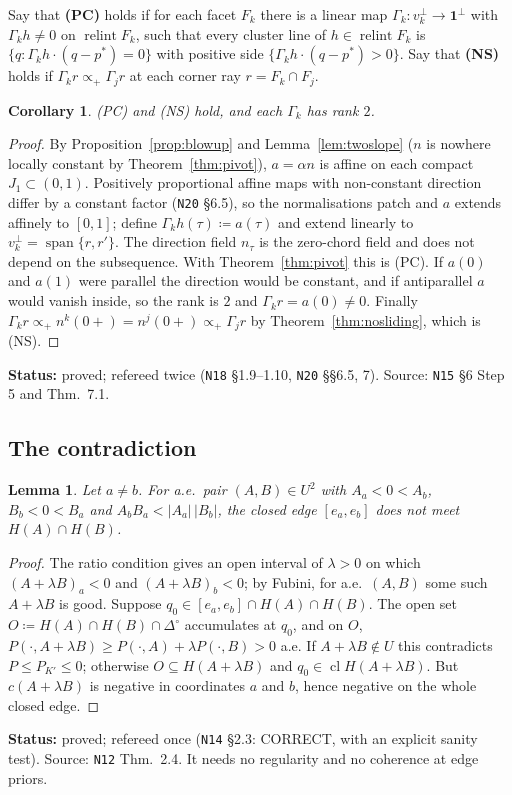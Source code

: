 \documentclass[11pt]{article}
\newtheorem{lemma}[theorem]{Lemma}
\newtheorem{corollary}[theorem]{Corollary}
\theoremstyle{definition}
\theoremstyle{remark}
\newcommand{\one}{\mathbf 1}
\newcommand{\Di}{\Delta^{\circ}}
\newcommand{\cl}{\operatorname{cl}}
\newcommand{\relint}{\operatorname{relint}}
\newcommand{\src}[1]{\texttt{#1}}
\newcommand{\status}[1]{\par\smallskip\noindent\textbf{Status:} #1\par\smallskip}
\begin{document}
Say that \textbf{(PC)} holds if for each facet $F_k$ there is a linear map $\Gamma_k:v_k^\perp\to\one^\perp$ with $\Gamma_kh\ne0$ on $\relint F_k$, such that every cluster line of $h\in\relint F_k$ is $\{q:\Gamma_kh\cdot(q-p^*)=0\}$ with positive side $\{\Gamma_kh\cdot(q-p^*)>0\}$. Say that \textbf{(NS)} holds if $\Gamma_kr\propto_+\Gamma_jr$ at each corner ray $r=F_k\cap F_j$.

\begin{corollary}\label{cor:PCNS}
(PC) and (NS) hold, and each $\Gamma_k$ has rank $2$.
\end{corollary}
\begin{proof}
By Proposition~\ref{prop:blowup} and Lemma~\ref{lem:twoslope} ($n$ is nowhere locally constant by Theorem~\ref{thm:pivot}), $a=\alpha n$ is affine on each compact $J_1\subset(0,1)$. Positively proportional affine maps with non-constant direction differ by a constant factor (\src{N20} \S6.5), so the normalisations patch and $a$ extends affinely to $[0,1]$; define $\Gamma_kh(\tau)\coloneqq a(\tau)$ and extend linearly to $v_k^\perp=\operatorname{span}\{r,r'\}$. The direction field $n_\tau$ is the zero-chord field and does not depend on the subsequence. With Theorem~\ref{thm:pivot} this is (PC). If $a(0)$ and $a(1)$ were parallel the direction would be constant, and if antiparallel $a$ would vanish inside, so the rank is $2$ and $\Gamma_kr=a(0)\ne0$. Finally $\Gamma_kr\propto_+n^k(0+)=n^j(0+)\propto_+\Gamma_jr$ by Theorem~\ref{thm:nosliding}, which is (NS).
\end{proof}
\status{proved; refereed twice (\src{N18} \S1.9--1.10, \src{N20} \S\S6.5, 7). Source: \src{N15} \S6 Step 5 and Thm.~7.1.}

\subsection{The contradiction}\label{sec:contradiction}

\begin{lemma}\label{lem:edgebox}
Let $a\ne b$. For a.e.\ pair $(A,B)\in U^2$ with $A_a<0<A_b$, $B_b<0<B_a$ and $A_bB_a<|A_a|\,|B_b|$, the closed edge $[e_a,e_b]$ does not meet $H(A)\cap H(B)$.
\end{lemma}
\begin{proof}
The ratio condition gives an open interval of $\lambda>0$ on which $(A+\lambda B)_a<0$ and $(A+\lambda B)_b<0$; by Fubini, for a.e.\ $(A,B)$ some such $A+\lambda B$ is good. Suppose $q_0\in[e_a,e_b]\cap H(A)\cap H(B)$. The open set $O\coloneqq H(A)\cap H(B)\cap\Di$ accumulates at $q_0$, and on $O$, $P(\cdot,A+\lambda B)\ge P(\cdot,A)+\lambda P(\cdot,B)>0$ a.e. If $A+\lambda B\notin U$ this contradicts $P\le P_{K'}\le0$; otherwise $O\subseteq H(A+\lambda B)$ and $q_0\in\cl H(A+\lambda B)$. But $c(A+\lambda B)$ is negative in coordinates $a$ and $b$, hence negative on the whole closed edge.
\end{proof}
\status{proved; refereed once (\src{N14} \S2.3: CORRECT, with an explicit sanity test). Source: \src{N12} Thm.~2.4. It needs no regularity and no coherence at edge priors.}
\end{document}

